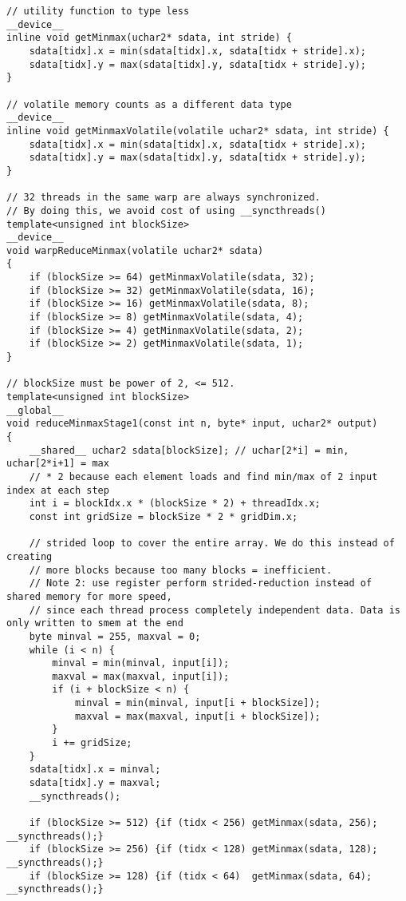 \documentclass[14pt]{article}
\begin{document}
\begin{lstlisting}
// utility function to type less
__device__
inline void getMinmax(uchar2* sdata, int stride) {
    sdata[tidx].x = min(sdata[tidx].x, sdata[tidx + stride].x);
    sdata[tidx].y = max(sdata[tidx].y, sdata[tidx + stride].y);    
}

// volatile memory counts as a different data type
__device__
inline void getMinmaxVolatile(volatile uchar2* sdata, int stride) {
    sdata[tidx].x = min(sdata[tidx].x, sdata[tidx + stride].x);
    sdata[tidx].y = max(sdata[tidx].y, sdata[tidx + stride].y);    
}

// 32 threads in the same warp are always synchronized.
// By doing this, we avoid cost of using __syncthreads()
template<unsigned int blockSize>
__device__
void warpReduceMinmax(volatile uchar2* sdata)
{
    if (blockSize >= 64) getMinmaxVolatile(sdata, 32);
    if (blockSize >= 32) getMinmaxVolatile(sdata, 16);
    if (blockSize >= 16) getMinmaxVolatile(sdata, 8);
    if (blockSize >= 8) getMinmaxVolatile(sdata, 4);
    if (blockSize >= 4) getMinmaxVolatile(sdata, 2);
    if (blockSize >= 2) getMinmaxVolatile(sdata, 1);
}

// blockSize must be power of 2, <= 512.
template<unsigned int blockSize>
__global__
void reduceMinmaxStage1(const int n, byte* input, uchar2* output)
{
    __shared__ uchar2 sdata[blockSize]; // uchar[2*i] = min, uchar[2*i+1] = max
    // * 2 because each element loads and find min/max of 2 input index at each step
    int i = blockIdx.x * (blockSize * 2) + threadIdx.x; 
    const int gridSize = blockSize * 2 * gridDim.x;    

    // strided loop to cover the entire array. We do this instead of creating 
    // more blocks because too many blocks = inefficient.
    // Note 2: use register perform strided-reduction instead of shared memory for more speed, 
    // since each thread process completely independent data. Data is only written to smem at the end
    byte minval = 255, maxval = 0;
    while (i < n) {        
        minval = min(minval, input[i]);
        maxval = max(maxval, input[i]);
        if (i + blockSize < n) {
            minval = min(minval, input[i + blockSize]);
            maxval = max(maxval, input[i + blockSize]);
        }
        i += gridSize;
    }        
    sdata[tidx].x = minval;
    sdata[tidx].y = maxval;    
    __syncthreads();

    if (blockSize >= 512) {if (tidx < 256) getMinmax(sdata, 256); __syncthreads();}
    if (blockSize >= 256) {if (tidx < 128) getMinmax(sdata, 128); __syncthreads();}
    if (blockSize >= 128) {if (tidx < 64)  getMinmax(sdata, 64);  __syncthreads();}


\end{lstlisting}
\end{document}
